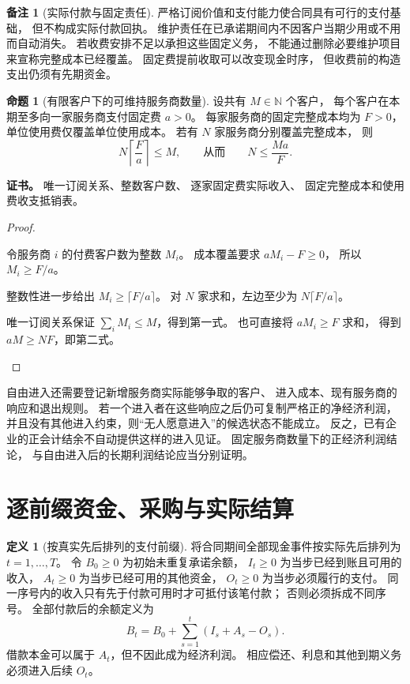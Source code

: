\documentclass[UTF8,12pt,a4paper,openany,fontset=none,zihao=false]{ctexrep}
\theoremstyle{definition}
\newtheorem{definition}{定义}[chapter]
\newtheorem{proposition}{命题}[chapter]
\newtheorem{remark}{备注}[chapter]
\newenvironment{certificate}{\par\noindent\textbf{证书。}\ignorespaces}{\par}
\newcommand{\NN}{\mathbb N}
\newcommand{\1}{\mathbf 1}
\begin{document}
\begin{remark}[实际付款与固定责任]
严格订阅价值和支付能力使合同具有可行的支付基础，
但不构成实际付款回执。
维护责任在已承诺期间内不因客户当期少用或不用而自动消失。
若收费安排不足以承担这些固定义务，
不能通过删除必要维护项目来宣称完整成本已经覆盖。
固定费提前收取可以改变现金时序，
但收费前的构造支出仍须有先期资金。
\end{remark}

\begin{proposition}[有限客户下的可维持服务商数量]
\label{market:entry-bound}
设共有 \(M\in\NN\) 个客户，
每个客户在本期至多向一家服务商支付固定费 \(a>0\)。
每家服务商的固定完整成本均为 \(F>0\)，
单位使用费仅覆盖单位使用成本。
若有 \(N\) 家服务商分别覆盖完整成本，
则
\[
 N\left\lceil\frac{F}{a}\right\rceil\le M,
 \qquad\text{从而}\qquad
 N\le\frac{Ma}{F}.
\]
\end{proposition}
\begin{certificate}
唯一订阅关系、整数客户数、
逐家固定费实际收入、
固定完整成本和使用费收支抵销表。
\end{certificate}
\begin{proof}
\begin{semanticsteps}
\item 令服务商 \(i\) 的付费客户数为整数 \(M_i\)。
成本覆盖要求 \(aM_i-F\ge0\)，
所以 \(M_i\ge F/a\)。
\item 整数性进一步给出
\(M_i\ge\lceil F/a\rceil\)。
对 \(N\) 家求和，左边至少为
\(N\lceil F/a\rceil\)。
\item 唯一订阅关系保证
\(\sum_iM_i\le M\)，得到第一式。
也可直接将 \(aM_i\ge F\) 求和，
得到 \(aM\ge NF\)，即第二式。
\end{semanticsteps}
\end{proof}

自由进入还需要登记新增服务商实际能够争取的客户、
进入成本、现有服务商的响应和退出规则。
若一个进入者在这些响应之后仍可复制严格正的净经济利润，
并且没有其他进入约束，则“无人愿意进入”的候选状态不能成立。
反之，已有企业的正会计结余不自动提供这样的进入见证。
固定服务商数量下的正经济利润结论，
与自由进入后的长期利润结论应当分别证明。

\section{逐前缀资金、采购与实际结算}

\begin{definition}[按真实先后排列的支付前缀]
\label{market:cash-data}
将合同期间全部现金事件按实际先后排列为
\(t=1,\ldots,T\)。
令 \(B_0\ge0\) 为初始未重复承诺余额，
\(I_t\ge0\) 为当步已经到账且可用的收入，
\(A_t\ge0\) 为当步已经可用的其他资金，
\(O_t\ge0\) 为当步必须履行的支付。
同一序号内的收入只有先于付款可用时才可抵付该笔付款；
否则必须拆成不同序号。
全部付款后的余额定义为
\[
 B_t=B_0+\sum_{s=1}^t(I_s+A_s-O_s).
\]
借款本金可以属于 \(A_t\)，但不因此成为经济利润。
相应偿还、利息和其他到期义务必须进入后续 \(O_t\)。
\end{definition}
\end{document}
